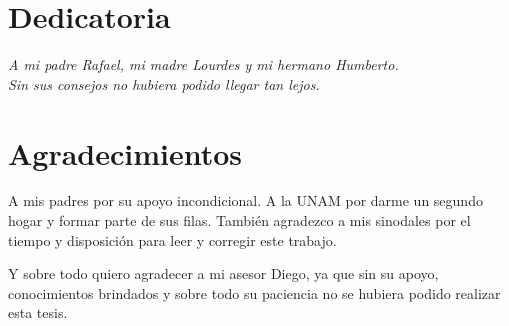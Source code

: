 \documentclass[12pt,a4paper]{book}
\begin{document}
\chapter*{Dedicatoria}

%
\begin{flushright}
\textit{A mi padre Rafael, mi madre Lourdes y mi hermano Humberto. \\Sin sus consejos no hubiera podido llegar tan lejos. \\}
\end{flushright}

%
\chapter*{Agradecimientos} %

A mis padres por su apoyo incondicional. A la UNAM por darme un segundo hogar y formar parte de sus filas. También agradezco a mis sinodales por el
tiempo y disposición para leer y corregir este trabajo. 

Y sobre todo quiero agradecer a mi asesor Diego, ya que sin su apoyo, conocimientos brindados y sobre todo su paciencia
no se hubiera podido realizar esta tesis.

\end{document}
